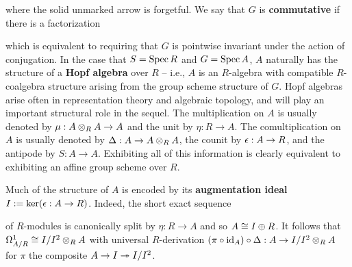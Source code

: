 \documentclass[11pt]{article}
\begin{document}
\begin{center}
\end{center}
where the solid unmarked arrow is forgetful. We say that $G$ is \textbf{commutative} if there is a factorization
\begin{center}
\end{center}
which is equivalent to requiring that $G$ is pointwise invariant under the action of conjugation. In the case that $S=\operatorname{Spec} R$ and $G=\operatorname{Spec} A$, $A$ naturally has the structure of a \textbf{Hopf algebra} over $R$ -- i.e., $A$ is an $R$-algebra with compatible $R$-coalgebra structure arising from the group scheme structure of $G$. Hopf algebras arise often in representation theory and algebraic topology, and will play an important structural role in the sequel. The multiplication on $A$ is usually denoted by $\mu: A\otimes_RA\to A$ and the unit by $\eta: R\to A$. The comultiplication on $A$ is usually denoted by $\Delta: A\to A\otimes_RA$, the counit by $\epsilon: A\to R$, and the antipode by $S: A\to A$. Exhibiting all of this information is clearly equivalent to exhibiting an affine group scheme over $R$.

\begin{remark}
Much of the structure of $A$ is encoded by its \textbf{augmentation ideal} $I:=\ker(\epsilon: A\to R)$. Indeed, the short exact sequence
\begin{center}
\end{center}
of $R$-modules is canonically split by $\eta: R\to A$ and so $A\cong I\oplus R$. It follows that $\Omega_{A/R}^1\cong I/I^2\otimes_RA$ with universal $R$-derivation $(\pi\circ\operatorname{id}_A)\circ\Delta: A\to I/I^2\otimes_RA$ for $\pi$ the composite $A\to I\twoheadrightarrow I/I^2$.
\end{remark}
\end{document}
